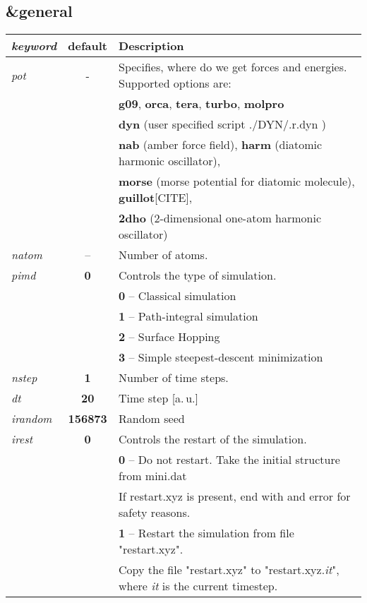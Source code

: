 \documentclass[12pt,a4paper]{article}
\begin{document}
\subsection{\&general}
\begin{tabular}{lcl}
\textit{keyword} & \textbf{default} & Description \\
\hline 

\textit{pot} & - & Specifies, where do we get forces and energies. Supported options are: \\
 &  & \textbf{g09}, \textbf{orca}, \textbf{tera}, \textbf{turbo}, \textbf{molpro} \\
 &  & \textbf{dyn} (user specified script ./DYN/.r.dyn ) \\
 &  & \textbf{nab} (amber force field), \textbf{harm} (diatomic harmonic oscillator), \\ 
 &  & \textbf{morse} (morse potential for diatomic molecule), \textbf{guillot}[CITE],\\
 &  & \textbf{2dho} (2-dimensional one-atom harmonic oscillator) \\ 

\textit{natom} & -- &  Number of atoms. \\ 
 
\textit{pimd} & \textbf{0} & Controls the type of simulation. \\  
 & & \textbf{0} -- Classical simulation \\ 
 & & \textbf{1} -- Path-integral simulation \\  
 & & \textbf{2} -- Surface Hopping \\
 & & \textbf{3} -- Simple steepest-descent minimization \\ 

\textit{nstep} & \textbf{1}& Number of time steps. \\

\textit{dt} & \textbf{20} & Time step [a.\,u.] \\

\textit{irandom} & \textbf{156873} & Random seed \\ 

\textit{irest} & \textbf{0} & Controls the restart of the simulation. \\
 & & \textbf{0} -- Do not restart. Take the initial structure from mini.dat \\
 & & If restart.xyz is present, end with and error for safety reasons. \\
 & & \textbf{1} -- Restart the simulation from file "restart.xyz". \\ 
 & & Copy the file "restart.xyz" to "restart.xyz.\textit{it}", where \textit{it} is the current timestep.  \\


\end{tabular}
\end{document}
